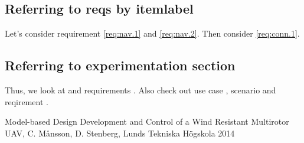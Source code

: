 \documentclass[a4paper]{article}
\begin{document}
\subsection{Referring to reqs by itemlabel}
Let's consider requirement \ref{req:nav.1} and \ref{req:nav.2}. Then consider \ref{req:conn.1}.

\subsection{Referring to experimentation section}
Thus, we look at  and requirements . Also check out use case , scenario  and reqirement .

\begin{thebibliography}{99}
 Model-based Design Development and Control of a Wind Resistant Multirotor UAV, C. Månsson, D. Stenberg, Lunds Tekniska Högskola 2014
\end{thebibliography}
\end{document}
